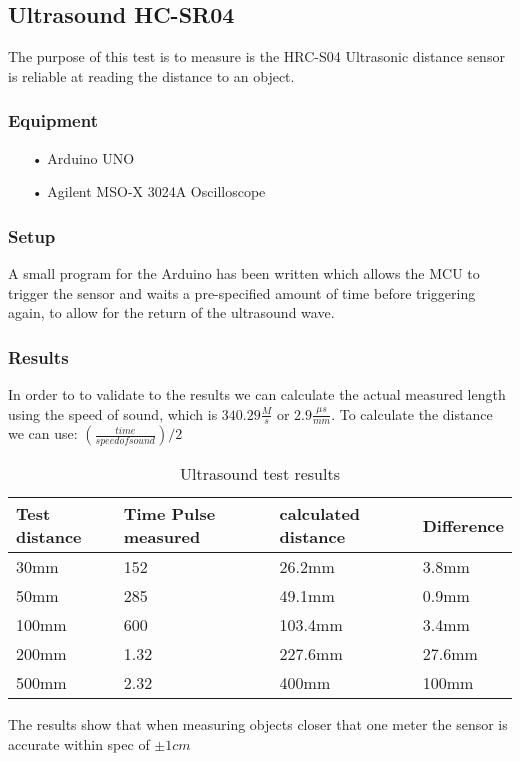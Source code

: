\subsection{Ultrasound HC-SR04}
The purpose of this test is to measure is the HRC-S04 Ultrasonic distance sensor is reliable at reading the distance to an object.

\subsubsection{Equipment}

\begin{enumerate}
    \item[•]Arduino UNO
    \item[•]Agilent MSO-X 3024A Oscilloscope    
\end{enumerate}

\subsubsection{Setup}
A small program for the Arduino has been written which allows the MCU to trigger the sensor and waits a pre-specified amount of time before triggering again, to allow for the return of the ultrasound wave. 

\subsubsection{Results}
In order to to validate to the results we can calculate the actual measured length using the speed of sound, which is $ 340.29 \frac{M}{s} $ or $2.9\frac{\mu s}{mm}$. To calculate the distance we can use: $(\frac{time}{speed of sound})/2$ \cite{SOF}
\begin{table}[h]
\centering
\label{ultrasoundtestresults}
\begin{tabular}{|l|l|l|l|}
\hline
\textbf{Test distance} & \textbf{Time Pulse measured} & \textbf{calculated  distance} & \textbf{Difference} \\ \hline
30mm          & 152                 & 26.2mm               & 3.8mm      \\ \hline
50mm          & 285                 & 49.1mm               & 0.9mm      \\ \hline
100mm         & 600                 & 103.4mm              & 3.4mm      \\ \hline
200mm         & 1.32                & 227.6mm              & 27.6mm     \\ \hline
500mm         & 2.32                & 400mm                & 100mm      \\ \hline
\end{tabular}
\caption{Ultrasound test results}
\end{table}

The results show that when measuring objects closer that one meter the sensor is accurate within spec of $\pm 1cm$